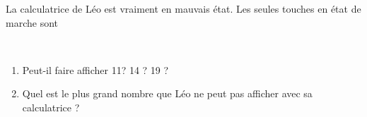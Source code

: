 
La calculatrice de Léo est vraiment en mauvais état. Les seules touches en état de marche sont

 $\quad$       $\quad$  \touche{+}   $\quad$  \touche{=}

\begin{enumerate}
\item Peut-il faire afficher 11? 14 ? 19 ?
\item Quel est le plus grand nombre que Léo ne peut pas afficher avec sa calculatrice ?
\end{enumerate}


